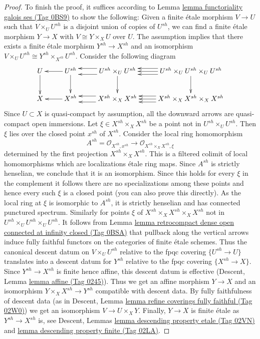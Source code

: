 \documentclass{amsart}
\theoremstyle{plain}
\theoremstyle{definition}
\theoremstyle{remark}
\numberwithin{equation}{subsection}
\begin{document}
\begin{proof}
\medskip\noindent
To finish the proof, it suffices according to
Lemma \href{https://stacks.math.columbia.edu/tag/0BS9}{lemma functoriality galois ses (Tag 0BS9)}
to show the following: Given a finite \'etale morphism
$V \to U$ such that $V \times_U U^{sh}$ is a disjoint
union of copies of $U^{sh}$, we can find a finite \'etale
morphism $Y \to X$ with $V \cong Y \times_X U$ over $U$.
The assumption implies that there exists a finite \'etale
morphism $Y^{sh} \to X^{sh}$ and an isomorphism
$V \times_U U^{sh} \cong Y^{sh} \times_{X^{sh}} U^{sh}$.
Consider the following diagram
$$
\xymatrix{
U \ar[d] & U^{sh} \ar[d] \ar[l] &
U^{sh} \times_U U^{sh} \ar[d] \ar@<1ex>[l] \ar@<-1ex>[l] &
U^{sh} \times_U U^{sh} \times_U U^{sh}
\ar[d] \ar@<1ex>[l] \ar[l] \ar@<-1ex>[l] \\
X & X^{sh} \ar[l] &
X^{sh} \times_X X^{sh} \ar@<1ex>[l] \ar@<-1ex>[l] &
X^{sh} \times_X X^{sh} \times_X X^{sh} \ar@<1ex>[l] \ar[l] \ar@<-1ex>[l]
}
$$
Since $U \subset X$ is quasi-compact by assumption, all the
downward arrows are quasi-compact open immersions.
Let $\xi \in X^{sh} \times_X X^{sh}$ be a point not
in $U^{sh} \times_U U^{sh}$. Then $\xi$ lies over the closed
point $x^{sh}$ of $X^{sh}$.
Consider the local ring homomorphism
$$
A^{sh} = \mathcal{O}_{X^{sh}, x^{sh}} \to
\mathcal{O}_{X^{sh} \times_X X^{sh}, \xi}
$$
determined by the first projection $X^{sh} \times_X X^{sh}$.
This is a filtered colimit of local homomorphisms which are
localizations \'etale ring maps.
Since $A^{sh}$ is strictly henselian, we conclude that it is an
isomorphism. Since this holds for every $\xi$ in the complement
it follows there are no specializations among these points and
hence every such $\xi$ is a closed point (you can also prove
this directly). As the local ring at $\xi$ is isomorphic
to $A^{sh}$, it is strictly henselian and has connected punctured spectrum.
Similarly for points $\xi$ of $X^{sh} \times_X X^{sh} \times_X X^{sh}$ not
in $U^{sh} \times_U U^{sh} \times_U U^{sh}$. It follows from
Lemma \href{https://stacks.math.columbia.edu/tag/0BSA}{lemma retrocompact dense open connected at infinity closed (Tag 0BSA)}
that pullback along the vertical arrows induce fully faithful functors on
the categories of finite \'etale schemes. Thus the
canonical descent datum on $V \times_U U^{sh}$ relative to
the fpqc covering $\{U^{sh} \to U\}$ translates into a
descent datum for $Y^{sh}$ relative to the fpqc covering $\{X^{sh} \to X\}$.
Since $Y^{sh} \to X^{sh}$ is finite hence affine, this descent datum is
effective (Descent, Lemma \href{https://stacks.math.columbia.edu/tag/0245}{lemma affine (Tag 0245)}).
Thus we get an affine morphism $Y \to X$ and an isomorphism
$Y \times_X X^{sh} \to Y^{sh}$ compatible with descent data.
By fully faithfulness of descent data
(as in Descent, Lemma \href{https://stacks.math.columbia.edu/tag/02W0}{lemma refine coverings fully faithful (Tag 02W0)})
we get an isomorphism $V \to U \times_X Y$.
Finally, $Y \to X$ is finite \'etale as $Y^{sh} \to X^{sh}$ is, see
Descent, Lemmas \href{https://stacks.math.columbia.edu/tag/02VN}{lemma descending property etale (Tag 02VN)} and
\href{https://stacks.math.columbia.edu/tag/02LA}{lemma descending property finite (Tag 02LA)}.
\end{proof}
\end{document}
